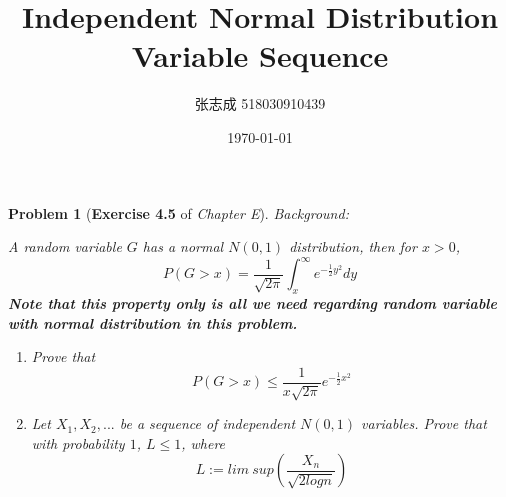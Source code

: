 \documentclass[UTF8, 12pt]{article}
\title{Independent Normal Distribution Variable Sequence}
\author{张志成 518030910439}
\date{\today}
\theoremstyle{break}
\newtheorem{problem}{Problem}
\begin{document}
    \maketitle
    
    \begin{problem}[\textbf{Exercise 4.5} of \textit{Chapter E}]
        \textit{Background: } \par
        A random variable $G$ has a normal $N(0,1)$ distribution, then for $x > 0$,
        $$
        P(G > x) = \frac{1}{\sqrt{2\pi}}\int_{x}^{\infty}e^{-\frac{1}{2}y^2}dy
        $$
        \textbf{Note that this property only is all we need regarding random variable with normal distribution in this problem.}
        \begin{enumerate}
            \item Prove that  $$ P(G > x) \leq \frac{1}{x\sqrt{2\pi}}e^{-\frac{1}{2}x^2} $$
            \item
                Let $X_1,X_2,...$ be a sequence of independent $N(0,1)$ variables. Prove that with probability $1$, $L \leq 1$, where
                $$
                L := lim\ sup(\frac{X_n}{\sqrt{2logn}})
                $$
        \end{enumerate}
    \end{problem}
\end{document}

